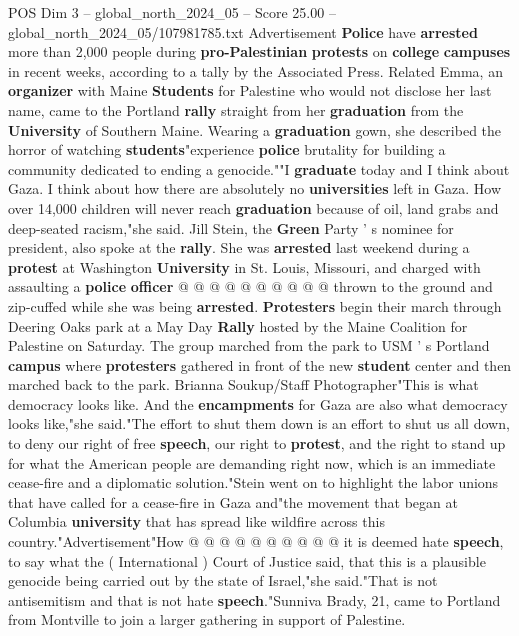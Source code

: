 \begin{textsample}{POS Dim 3 – global\_north\_2024\_05 – Score 25.00 – global\_north\_2024\_05/107981785.txt}
Advertisement \textbf{Police} have \textbf{arrested} more than 2,000 people during \textbf{pro-Palestinian} \textbf{protests} on \textbf{college} \textbf{campuses} in recent weeks, according to a tally by the Associated Press.
Related Emma, an \textbf{organizer} with Maine \textbf{Students} for Palestine who would not disclose her last name, came to the Portland \textbf{rally} straight from her \textbf{graduation} from the \textbf{University} of Southern Maine.
Wearing a \textbf{graduation} gown, she described the horror of watching \textbf{students}"experience \textbf{police} brutality for building a community dedicated to ending a genocide.""I \textbf{graduate} today and I think about Gaza.
I think about how there are absolutely no \textbf{universities} left in Gaza.
How over 14,000 children will never reach \textbf{graduation} because of oil, land grabs and deep-seated racism,"she said.
Jill Stein, the \textbf{Green} Party ' s nominee for president, also spoke at the \textbf{rally}.
She was \textbf{arrested} last weekend during a \textbf{protest} at Washington \textbf{University} in St.
Louis, Missouri, and charged with assaulting a \textbf{police} \textbf{officer} @ @ @ @ @ @ @ @ @ @ thrown to the ground and zip-cuffed while she was being \textbf{arrested}. \textbf{Protesters} begin their march through Deering Oaks park at a May Day \textbf{Rally} hosted by the Maine Coalition for Palestine on Saturday.
The group marched from the park to USM ' s Portland \textbf{campus} where \textbf{protesters} gathered in front of the new \textbf{student} center and then marched back to the park.
Brianna Soukup/Staff Photographer"This is what democracy looks like.
And the \textbf{encampments} for Gaza are also what democracy looks like,"she said."The effort to shut them down is an effort to shut us all down, to deny our right of free \textbf{speech}, our right to \textbf{protest}, and the right to stand up for what the American people are demanding right now, which is an immediate cease-fire and a diplomatic solution."Stein went on to highlight the labor unions that have called for a cease-fire in Gaza and"the movement that began at Columbia \textbf{university} that has spread like wildfire across this country."Advertisement"How @ @ @ @ @ @ @ @ @ @ it is deemed hate \textbf{speech}, to say what the ( International ) Court of Justice said, that this is a plausible genocide being carried out by the state of Israel,"she said."That is not antisemitism and that is not hate \textbf{speech}."Sunniva Brady, 21, came to Portland from Montville to join a larger gathering in support of Palestine.

\end{textsample}
